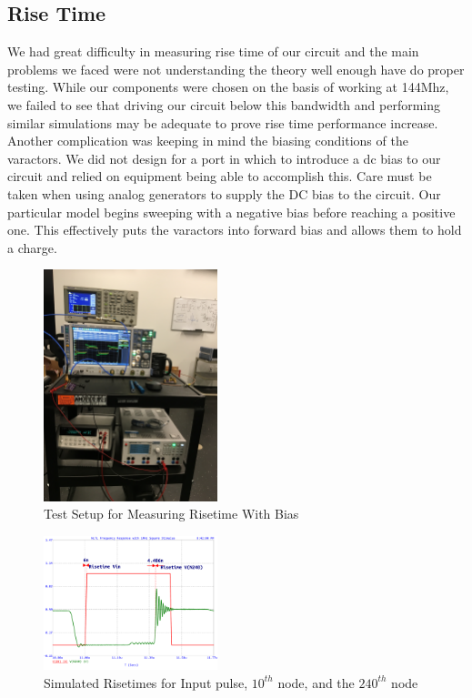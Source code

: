 \documentclass[journal]{IEEEtran} \usepackage[english]{babel}
\begin{document}
\subsection{Rise Time}\label{RiseTimeMeasResults}

We had great difficulty in measuring rise time of our circuit and the main
problems we faced were not understanding the theory well enough have do proper
testing. While our components were chosen on the basis of working at 144Mhz, we
failed to see that driving our circuit below this bandwidth and performing
similar simulations may be adequate to prove rise time performance increase.
Another complication was keeping in mind the biasing conditions of the
varactors. We did not design for a port in which to introduce a dc bias to our
circuit and relied on equipment being able to accomplish this. Care must be
taken when using analog generators to supply the DC bias to the circuit. Our
particular model begins sweeping with a negative bias before reaching a positive
one. This effectively puts the varactors into forward bias and allows them to
hold a charge.






\begin{figure}[htb]
\centering
\includegraphics[width=0.45\textwidth,angle = -90]{SetupWithBiasing.JPG}
\caption{Test Setup for Measuring Risetime With Bias}
\label{fig:SetupWBiasing}
\end{figure}


\begin{figure}[htb]
\centering
\includegraphics[width=0.45\textwidth]{Probed_Input_N10_N240_NoSeriesResistance}
\caption{Simulated Risetimes for Input pulse, $10^{th}$ node, and the $240^{th}$ node}
\label{fig:probedNoResistance}
\end{figure}
\end{document}
